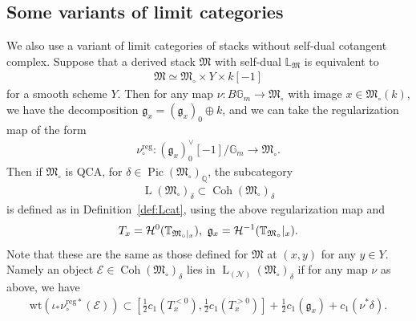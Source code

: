 \documentclass[11pt,oneside,a4paper,mathscr]{amsart}
\theoremstyle{definition}
\newcommand{\LL}{\operatorname{L}}
\newcommand{\Pic}{\operatorname{Pic}}
\newcommand{\cE}{\mathcal{E}}
\newcommand{\bgm}{B\mathbb{G}_m}
\newcommand{\Coh}{\operatorname{Coh}}
\newcommand{\wt}{\mathrm{wt}}
\begin{document}
\subsection{Some variants of limit categories}\label{subsec:variant}
We also use a variant of limit categories of stacks without self-dual 
cotangent complex. 
Suppose that a derived stack $\mathfrak{M}$ with self-dual 
$\mathbb{L}_{\mathfrak{M}}$ is equivalent to  
\begin{align*}
    \mathfrak{M} \simeq \mathfrak{M}_{\circ}\times Y \times k[-1]
    \end{align*}
    for a smooth scheme $Y$. 
Then for any map $\nu \colon \bgm \to \mathfrak{M}_{\circ}$
with image $x\in \mathfrak{M}_{\circ}(k)$, 
we have the decomposition $\mathfrak{g}_x=(\mathfrak{g}_x)_0 \oplus k$, and 
we can take the regularization map of the form 
\begin{align*}
    \nu_{\circ}^{\mathrm{reg}} \colon (\mathfrak{g}_x)_0^{\vee}[-1]/\mathbb{G}_m \to 
    \mathfrak{M}_{\circ}. 
\end{align*}
Then if $\mathfrak{M}_{\circ}$ is QCA, for $\delta \in \Pic(\mathfrak{M}_{\circ})_{\mathbb{Q}}$, 
the subcategory 
\begin{align*}
    \LL(\mathfrak{M}_{\circ})_{\delta} \subset 
     \Coh(\mathfrak{M}_{\circ})_{\delta}
\end{align*}
is defined as in Definition~\ref{def:Lcat}, using the above regularization map 
and 
\begin{align}\notag
    T_x=\mathcal{H}^{0}(\mathbb{T}_{\mathfrak{M}_{\circ}|_{x}}), \ 
    \mathfrak{g}_x=\mathcal{H}^{-1}(\mathbb{T}_{\mathfrak{M}_{\circ}}|_{x}).
\end{align}
Note that these are the same as those defined for $\mathfrak{M}$ at $(x, y)$ for any $y\in Y$. 
Namely an object $\mathcal{E} \in     \Coh(\mathfrak{M}_{\circ})_{\delta}$
lies in $\LL_{(\mathcal{N})}(\mathfrak{M}_{\circ})_{\delta}$
if for any map $\nu$ as above, we have 
\begin{align}\label{cond:regcirc}
\wt(\iota_{\ast}\nu_{\circ}^{\mathrm{reg}\ast}(\cE))
\subset \left[\frac{1}{2} c_1 (T_x^{<0}),
\frac{1}{2} c_1 (T_x^{>0}) \right]+
\frac{1}{2}c_1(\mathfrak{g}_x)+c_1(\nu^*\delta).
\end{align}
\end{document}
